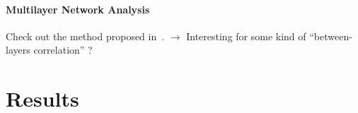 \paragraph{Multilayer Network Analysis}
Check out the method proposed in~\cite{iacovacci2015mesoscopic}. $\rightarrow$ Interesting for some kind of ``between-layers correlation'' ?








\section{Results}

















